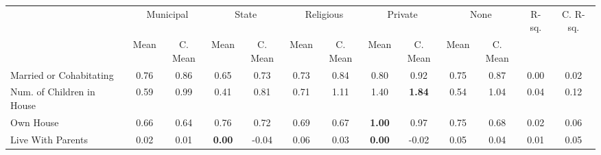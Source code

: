 \begin{tabular}{l c c c c c c c c c c c c}
\toprule
& \multicolumn{2}{c}{Municipal} & \multicolumn{2}{c}{State} & \multicolumn{2}{c}{Religious} & \multicolumn{2}{c}{Private} & \multicolumn{2}{c}{None} & R-sq. & C. R-sq. \\
& \scriptsize Mean & \scriptsize C. Mean & \scriptsize Mean & \scriptsize C. Mean & \scriptsize Mean & \scriptsize C. Mean & \scriptsize Mean & \scriptsize C. Mean & \scriptsize Mean & \scriptsize C. Mean & & \\
\midrule
Married or Cohabitating &      0.76 & 0.86 &      0.65 & 0.73 &      0.73 & 0.84 &      0.80 & 0.92 &      0.75 & 0.87 &      0.00 &      0.02 \\
Num. of Children in House &      0.59 & 0.99 &      0.41 & 0.81 &      0.71 & 1.11 &      1.40 & \textbf{     1.84} &      0.54 & 1.04 &      0.04 &      0.12 \\
Own House &      0.66 & 0.64 &      0.76 & 0.72 &      0.69 & 0.67 & \textbf{     1.00} & 0.97 &      0.75 & 0.68 &      0.02 &      0.06 \\
Live With Parents &      0.02 & 0.01 & \textbf{     0.00} & -0.04 &      0.06 & 0.03 & \textbf{     0.00} & -0.02 &      0.05 & 0.04 &      0.01 &      0.05 \\
\bottomrule
\end{tabular}
